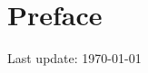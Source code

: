 \documentclass[10pt,oneside,openany]{memoir}
\begin{document}
    \chapter*{Preface}
    \vspace{-35pt}
    \lipsum[1]
    \vspace{-35pt}
    \tableofcontents
    \vfill
    \specialdate
    Last update: \today

    
    
\end{document}
